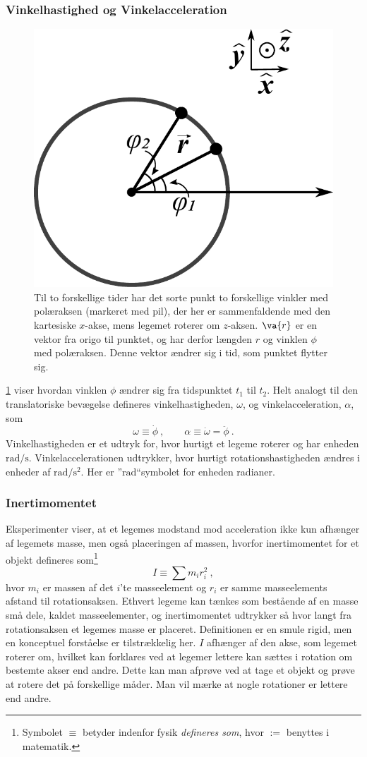 \subsubsection{Vinkelhastighed og Vinkelacceleration}
%
\begin{figure}[h!]
\centering
\includegraphics[width=.4\textwidth]{figurer/Roterende-Legeme}
\caption{Til to forskellige tider har det sorte punkt to forskellige vinkler med polæraksen (markeret med pil), der her er sammenfaldende med den kartesiske $x$-akse, mens legemet roterer om $z$-aksen. $\va{r}$ er en vektor fra origo til punktet, og har derfor længden $r$ og vinklen $\phi$ med polæraksen. Denne vektor ændrer sig i tid, som punktet flytter sig.}
\label{mek:fig:Roterende-Legeme}
\end{figure}
%
\cref{mek:fig:Roterende-Legeme} viser hvordan vinklen $\phi$ ændrer sig fra tidspunktet $t_1$ til $t_2$. Helt analogt til den translatoriske bevægelse defineres vinkelhastigheden, $\omega$, og vinkelacceleration, $\alpha$, som
%
\begin{equation}
    \omega\equiv\dot{\phi} \: , \qquad \alpha\equiv\dot{\omega}=\ddot{\phi} \: .
\end{equation}
%
Vinkelhastigheden er et udtryk for, hvor hurtigt et legeme roterer og har enheden $\si{\radian\per\second}$. Vinkelaccelerationen udtrykker, hvor hurtigt rotationshastigheden ændres i enheder af $\si{\radian\per\second\squared}$. Her er ''$\si{\radian}$``\;symbolet for enheden radianer.

\subsubsection{Inertimomentet}
Eksperimenter viser, at et legemes modstand mod acceleration ikke kun afhænger af legemets masse, men også placeringen af massen, hvorfor inertimomentet for et objekt defineres som\footnote{Symbolet $\equiv$ betyder indenfor fysik \textit{defineres som}, hvor $:=$ benyttes i matematik.}
%
\begin{equation} \label{mek:eq:Inertimoment}
    I \equiv \sum m_ir_i^2 \: ,
\end{equation}
%
hvor $m_i$ er massen af det $i$'te masseelement og $r_i$ er samme masseelements afstand til rotationsaksen. Ethvert legeme kan tænkes som bestående af en masse små dele, kaldet masseelementer, og inertimomentet udtrykker så hvor langt fra rotationsaksen et legemes masse er placeret. Definitionen er en smule rigid, men en konceptuel forståelse er tilstrækkelig her. $I$ afhænger af den akse, som legemet  roterer om, hvilket kan forklares ved at legemer lettere kan sættes i rotation om bestemte akser end andre. Dette kan man afprøve ved at tage et objekt og prøve at rotere det på forskellige måder. Man vil mærke at nogle rotationer er lettere end andre.


